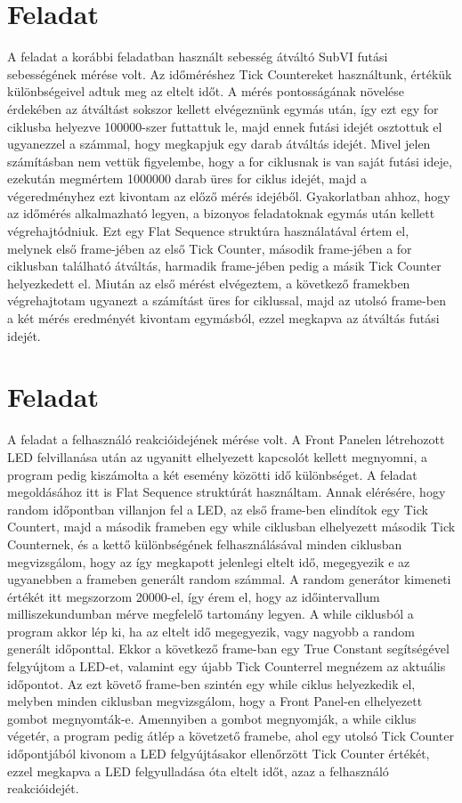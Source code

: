 \documentclass[10pt, conference,a4paper]{ITKproc}
\begin{document}
\section{Feladat}
A feladat a korábbi feladatban használt sebesség átváltó SubVI futási sebességének mérése volt. Az időméréshez Tick Countereket használtunk, értékük különbségeivel adtuk meg az eltelt időt. A mérés pontosságának növelése érdekében az átváltást sokszor kellett elvégeznünk egymás után, így ezt egy for ciklusba helyezve 100000-szer futtattuk le, majd ennek futási idejét osztottuk el ugyanezzel a számmal, hogy megkapjuk egy darab átváltás idejét. Mivel jelen számításban nem vettük figyelembe, hogy a for ciklusnak is van saját futási ideje, ezekután megmértem 1000000 darab üres for ciklus idejét, majd a végeredményhez ezt kivontam az előző mérés idejéből. Gyakorlatban ahhoz, hogy az időmérés alkalmazható legyen, a bizonyos feladatoknak egymás után kellett végrehajtódniuk. Ezt egy Flat Sequence struktúra használatával értem el, melynek első frame-jében az első Tick Counter, második frame-jében a for ciklusban található átváltás, harmadik frame-jében pedig a másik Tick Counter helyezkedett el. Miután az első mérést elvégeztem, a következő framekben végrehajtotam ugyanezt a számítást üres for ciklussal, majd az utolsó frame-ben a két mérés eredményét kivontam egymásból, ezzel megkapva az átváltás futási idejét. 
\section{Feladat}
A feladat a felhasználó reakcióidejének mérése volt. A Front Panelen létrehozott LED felvillanása után az ugyanitt elhelyezett kapcsolót kellett megnyomni, a program pedig kiszámolta a két esemény közötti idő különbséget. A feladat megoldásához itt is Flat Sequence struktúrát használtam. Annak elérésére, hogy random időpontban villanjon fel a LED, az első frame-ben elindítok egy Tick Countert, majd a második frameben egy while ciklusban elhelyezett második Tick Counternek, és a kettő különbségének felhasználásával minden ciklusban megvizsgálom, hogy az így megkapott jelenlegi eltelt idő, megegyezik e az ugyanebben a frameben generált random számmal. A random generátor kimeneti értékét itt megszorzom 20000-el, így érem el, hogy az időintervallum milliszekundumban mérve megfelelő tartomány legyen. A while ciklusból a program akkor lép ki, ha az eltelt idő megegyezik, vagy nagyobb a random generált időponttal. Ekkor a következő frame-ban egy True Constant segítségével felgyújtom a LED-et, valamint egy újabb Tick Counterrel megnézem az aktuális időpontot. Az ezt követő frame-ben szintén egy while ciklus helyezkedik el, melyben minden ciklusban megvizsgálom, hogy a Front Panel-en elhelyezett gombot megnyomták-e. Amennyiben a gombot megnyomják, a while ciklus végetér, a program pedig átlép a követzető framebe, ahol egy utolsó Tick Counter időpontjából kivonom a LED felgyújtásakor ellenőrzött Tick Counter értékét, ezzel megkapva a LED felgyulladása óta eltelt időt, azaz a felhasználó reakcióidejét. 
\end{document}
